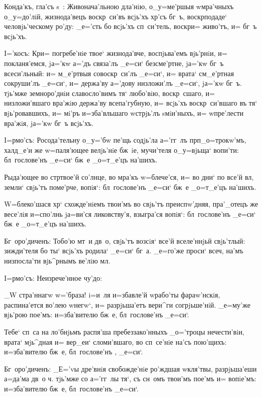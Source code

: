 Конда'къ, гла'съ s~: Живонача'льною дла'нiю, 
о_у=ме'ршыя w\т мра'чныхъ о_у=до'лiй, жизнода'вецъ 
воскр~си'въ всjь'хъ хр'съ бг~ъ, воскр подаде` 
человjь'ческому ро'ду: _е='сть бо всjь'хъ сп~си'тель, 
воскр и= живо'тъ, и= бг~ъ всjь'хъ.

I='косъ: Кр и= погребе'нiе твое` жизнода'вче, 
воспjьва'емъ вjь'рнiи, и= покланя'емся, jа='кw а='дъ 
связа'лъ _е=си` безсме'ртне, jа='кw бг~ъ всеси'льный: и= 
м_е'ртвыя совоскр~си'лъ _е=си`, и= врата` см_е'ртная 
сокруши'лъ _е=си`, и= держа'ву а='дову низложи'лъ _е=си`, 
jа='кw бг~ъ. тjь'мже земноро'днiи славосло'вимъ тя` 
любо'вiю, воскр~сшаго, и= низложи'вшаго вра'жiю держа'ву 
всепа'губную, и= всjь'хъ воскр~си'вшаго въ тя` 
вjь'ровавшихъ, и= мi'ръ и=зба'вльшаго w\т стрjь'лъ 
sмiи'ныхъ, и= w\т пре'лести вра'жiя, jа='кw бг~ъ всjь'хъ.


I=рмо'съ: Росода'тельну о_у='бw пе'щь содjь'ла 
а='гг~лъ прп _о=трокw'мъ, халд_е'и же w=паля'ющее 
велjь'нiе бж~iе, мучи'теля о_у=вjьща` вопи'ти: 
бл~гослове'нъ _е=си` бж~е _о=т_е'цъ на'шихъ.

Рыда'ющее во стр твое'й со'лнце, во мра'къ 
w=блече'ся, и= во дни` по все'й вл, земли` свjь'тъ 
поме'рче, вопiя`: бл~гослове'нъ _е=си` бж~е _о=т_е'цъ 
на'шихъ.

W=блеко'шася хр` схожде'нiемъ твои'мъ во свjь'тъ 
преиспw'дняя, пра'_отецъ же весе'лiя и=спо'лнь jа=ви'ся 
ликовству'я, взыгра'ся вопiя`: бл~гослове'нъ _е=си` бж~е 
_о=т_е'цъ на'шихъ.

Бг~оро'диченъ: Тобо'ю мт~и дв~о, свjь'тъ возсiя` все'й 
вселе'ннjьй свjь'тлый: зижди'теля бо ты` всjь'хъ родила` 
_е=си` бг~а. _е=го'же проси` всеч, на'мъ низпосла'ти 
вjь^рнымъ ве'лiю мл. 

 I=рмо'съ: Неизрече'нное чу'до:

_W стра'ннагw w='браза! i=и~ля и=збавле'й w\т рабо'ты 
фараw'нскiя, распина'ется во'лею w\т негw`, и= 
разрjьша'етъ вери^ги согрjьше'нiй. _е=му'же вjь'рою 
пое'мъ: и=зба'вителю бж~е, бл~гослове'нъ _е=си`.

Тебе` сп~са на ло'бнjьмъ распя'ша пребеззако'нныхъ 
_о='троцы нечести'вiи, врата` мjь^дная и= вер_еи` 
сломи'вшаго, во сп~се'нiе на'съ пою'щихъ: и=зба'вителю 
бж~е, бл~гослове'нъ , _е=си`.

Бг~оро'диченъ: _Е='vы дре'внiя свобожде'нiе ро'ждшая 
w\т кля'твы, разрjьша'еши а=да'ма дв~о ч. тjь'мже со 
а='гг~лы тя`, съ сн~омъ твои'мъ пое'мъ и= вопiе'мъ: 
и=зба'вителю бж~е, бл~гослове'нъ _е=си`.

